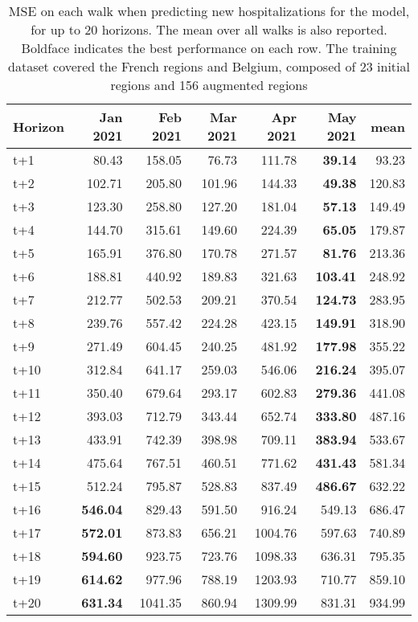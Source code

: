 \begin{table}[H]
\centering
\caption{MSE on each walk when predicting new hospitalizations for the model, for up to 20 horizons. The mean over all walks is also reported. Boldface indicates the best performance on each row. The training dataset covered the French regions and Belgium, composed of 23 initial regions and 156 augmented regions }
\label{tab:MSE_walk_custom_linear_regression}
\begin{tabular}{lrrrrrr}
\toprule
Horizon &  Jan 2021 &  Feb 2021 &  Mar 2021 &  Apr 2021 &  May 2021 &   mean \\
\midrule
t+1  & 80.43  & 158.05  & 76.73  & 111.78  & \textbf{39.14}  & 93.23  \\
t+2  & 102.71  & 205.80  & 101.96  & 144.33  & \textbf{49.38}  & 120.83  \\
t+3  & 123.30  & 258.80  & 127.20  & 181.04  & \textbf{57.13}  & 149.49  \\
t+4  & 144.70  & 315.61  & 149.60  & 224.39  & \textbf{65.05}  & 179.87  \\
t+5  & 165.91  & 376.80  & 170.78  & 271.57  & \textbf{81.76}  & 213.36  \\
t+6  & 188.81  & 440.92  & 189.83  & 321.63  & \textbf{103.41}  & 248.92  \\
t+7  & 212.77  & 502.53  & 209.21  & 370.54  & \textbf{124.73}  & 283.95  \\
t+8  & 239.76  & 557.42  & 224.28  & 423.15  & \textbf{149.91}  & 318.90  \\
t+9  & 271.49  & 604.45  & 240.25  & 481.92  & \textbf{177.98}  & 355.22  \\
t+10  & 312.84  & 641.17  & 259.03  & 546.06  & \textbf{216.24}  & 395.07  \\
t+11  & 350.40  & 679.64  & 293.17  & 602.83  & \textbf{279.36}  & 441.08  \\
t+12  & 393.03  & 712.79  & 343.44  & 652.74  & \textbf{333.80}  & 487.16  \\
t+13  & 433.91  & 742.39  & 398.98  & 709.11  & \textbf{383.94}  & 533.67  \\
t+14  & 475.64  & 767.51  & 460.51  & 771.62  & \textbf{431.43}  & 581.34  \\
t+15  & 512.24  & 795.87  & 528.83  & 837.49  & \textbf{486.67}  & 632.22  \\
t+16  & \textbf{546.04}  & 829.43  & 591.50  & 916.24  & 549.13  & 686.47  \\
t+17  & \textbf{572.01}  & 873.83  & 656.21  & 1004.76  & 597.63  & 740.89  \\
t+18  & \textbf{594.60}  & 923.75  & 723.76  & 1098.33  & 636.31  & 795.35  \\
t+19  & \textbf{614.62}  & 977.96  & 788.19  & 1203.93  & 710.77  & 859.10  \\
t+20  & \textbf{631.34}  & 1041.35  & 860.94  & 1309.99  & 831.31  & 934.99  \\

\bottomrule
\end{tabular}
\end{table}
